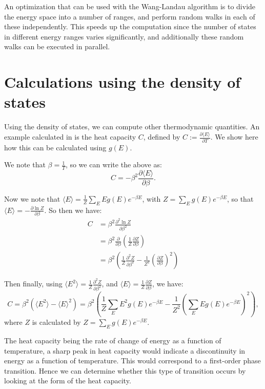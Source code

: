 \documentclass{article}
\begin{document}
An optimization that can be used with the Wang-Landau algorithm is to divide the energy space into a number of ranges, and perform random walks in each of these independently.
This speeds up the computation since the number of states in different energy ranges varies significantly, and additionally these random walks can be executed in parallel.

\section{Calculations using the density of states}
\label{sec:calculations}
Using the density of states, we can compute other thermodynamic quantities.
An example calculated in \cite{WangLandau} is the heat capacity $C$, defined by $C := \frac{\partial\langle E\rangle}{\partial T}$.
We show here how this can be calculated using $g(E)$.

We note that $\beta = \frac{1}{T}$, so we can write the above as:
$$ C = -\beta^2\frac{\partial\langle E\rangle}{\partial\beta}. $$

Now we note that $\langle E\rangle = \frac{1}{Z}\sum_E Eg(E)e^{-\beta E}$, with $Z = \sum_E g(E)e^{-\beta E}$, so that $\langle E\rangle = -\frac{\partial \ln Z}{\partial\beta}$.
So then we have:
\begin{align*}
C &= \beta^2\frac{\partial^2 \ln Z}{\partial\beta^2} \\
&= \beta^2\frac{\partial}{\partial\beta}\left(\frac{1}{Z}\frac{\partial Z}{\partial\beta}\right) \\
&= \beta^2\left(\frac{1}{Z}\frac{\partial^2 Z}{\partial\beta^2} - \frac{1}{Z^2}\left(\frac{\partial Z}{\partial\beta}\right)^2\right)
\end{align*}

Then finally, using $\langle E^2\rangle = \frac{1}{Z}\frac{\partial^2 Z}{\partial\beta^2}$, and $\langle E\rangle = \frac{1}{Z}\frac{\partial Z}{\partial\beta}$, we have:
$$ C = \beta^2\left(\langle E^2 \rangle - \langle E \rangle^2\right) = \beta^2\left(\frac{1}{Z}\sum_E E^2g(E)e^{-\beta E} - \frac{1}{Z^2}\left(\sum_E Eg(E)e^{-\beta E}\right)^2\right), $$
where $Z$ is calculated by $Z = \sum_E g(E)e^{-\beta E}$.

The heat capacity being the rate of change of energy as a function of temperature, a sharp peak in heat capacity would indicate a discontinuity in energy as a function of temperature.
This would correspond to a first-order phase transition.
Hence we can determine whether this type of transition occurs by looking at the form of the heat capacity.
\end{document}
